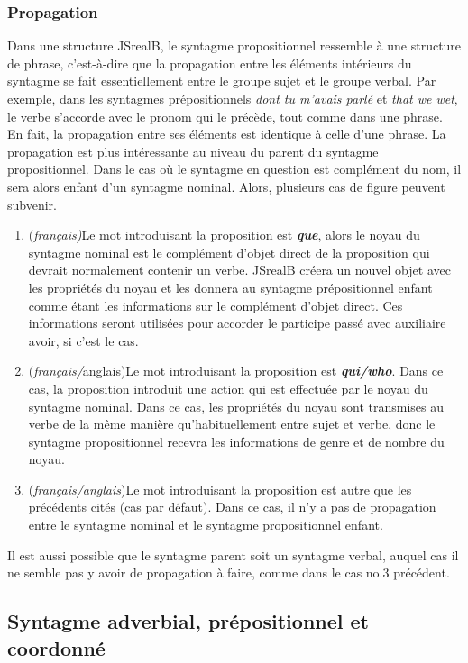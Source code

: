 \documentclass[11pt]{article} %
\newcommand{\system}[1]{\textsf{#1}}
\newcommand{\JSB}{\system{JSrealB}}
\begin{document}
\subsubsection{Propagation}

Dans une structure \JSB{}, le syntagme propositionnel ressemble à
une structure de phrase, c'est-à-dire que la propagation entre les
éléments intérieurs du syntagme se fait essentiellement entre le groupe
sujet et le groupe verbal. Par exemple, dans les syntagmes prépositionnels
\emph{dont tu m'avais parlé }et \emph{that we wet}, le verbe s'accorde
avec le pronom qui le précède, tout comme dans une phrase. En fait,
la propagation entre ses éléments est identique à celle d'une phrase.
La propagation est plus intéressante au niveau du parent du syntagme
propositionnel. Dans le cas où le syntagme en question est complément
du nom, il sera alors enfant d'un syntagme nominal. Alors, plusieurs
cas de figure peuvent subvenir. 
\begin{enumerate}
\item (\emph{français)}Le mot introduisant la proposition est \textbf{\emph{que}},
alors le noyau du syntagme nominal est le complément d'objet direct
de la proposition qui devrait normalement contenir un verbe. \JSB{}
créera un nouvel objet avec les propriétés du noyau et les donnera
au syntagme prépositionnel enfant comme étant les informations sur
le complément d'objet direct. Ces informations seront utilisées pour
accorder le participe passé avec auxiliaire avoir, si c'est le cas.
\item (\emph{français/}anglais)Le mot introduisant la proposition est \textbf{\emph{qui/who}}.
Dans ce cas, la proposition introduit une action qui est effectuée
par le noyau du syntagme nominal. Dans ce cas, les propriétés du noyau
sont transmises au verbe de la même manière qu'habituellement entre
sujet et verbe, donc le syntagme propositionnel recevra les informations
de genre et de nombre du noyau.
\item (\emph{français/anglais})Le mot introduisant la proposition est autre
que les précédents cités (cas par défaut). Dans ce cas, il n'y a pas
de propagation entre le syntagme nominal et le syntagme propositionnel
enfant. 
\end{enumerate}
Il est aussi possible que le syntagme parent soit un syntagme verbal,
auquel cas il ne semble pas y avoir de propagation à faire, comme
dans le cas no.3 précédent.

\subsection{Syntagme adverbial, prépositionnel et coordonné}
\end{document}
